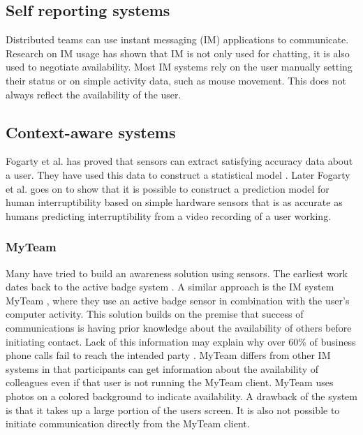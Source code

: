 \documentclass{sigchi}
\begin{document}
\subsection{Self reporting systems}
Distributed teams can use instant messaging (IM) applications to communicate.
Research on IM usage \cite{nardi2000interaction} \cite{handel2002chat} \cite{tang2001connexus} has shown that IM is not only used for chatting, it is also used to negotiate availability.
Most IM systems rely on the user manually setting their status or on simple activity data, such as mouse movement.
This does not always reflect the availability of the user.

\subsection{Context-aware systems}
Fogarty et al. \cite{fogarty2005predicting} has proved that sensors can extract satisfying accuracy data about a user.
They have used this data to construct a statistical model \cite{fogarty2004examining}.
Later Fogarty et al. goes on to show that it is possible to construct a prediction model for human interruptibility based on simple hardware sensors that is as accurate as humans predicting interruptibility from a video recording of a user working.

\subsubsection{MyTeam}
Many have tried to build an awareness solution using sensors.
The earliest work dates back to the active badge system \cite{want1992active}.
A similar approach is the IM system MyTeam \cite{lai2003myteam}, where they use an active badge sensor in combination with the  user's computer activity.
This solution builds on the premise that success of communications is having prior knowledge about the availability of others before initiating contact.
Lack of this information may explain why over 60\% of business phone calls fail to reach the intended party \cite{whittaker1995rethinking}.
MyTeam differs from other IM systems in that participants can get information about the availability of colleagues even if that user is not running the MyTeam client.
MyTeam uses photos on a colored background to indicate availability.
A drawback of the system is that it takes up a large portion of the users screen. It is also not possible to initiate communication directly from the MyTeam client.
\end{document}
